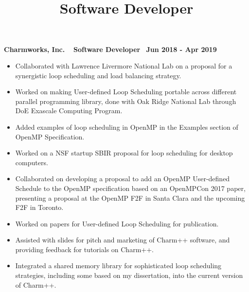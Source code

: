 \title{Software Developer}
\textbf{Charmworks, Inc. $\>$$\>$$\>$$\>$Software Developer$\>$$\>$$\>$$\>$Jun 2018 - Apr 2019}
\vspace{0.0in}
\begin{itemize}
\item Collaborated with Lawrence Livermore National Lab on a proposal for a synergistic loop scheduling and load balancing strategy. 
\item Worked on making User-defined Loop Scheduling portable across different parallel programming library, done with Oak Ridge National Lab through DoE Exascale Computing Program. 
\item Added examples of loop scheduling in OpenMP in the Examples section of OpenMP Specification.
\item Worked on a NSF startup SBIR proposal for loop scheduling for desktop computers. 
\item Collaborated on developing a proposal to add an OpenMP User-defined Schedule to the OpenMP specification based on an OpenMPCon 2017 paper, presenting a proposal at the OpenMP F2F in Santa Clara and the upcoming F2F in Toronto.
\item Worked on papers for User-defined Loop Scheduling for publication.
\item Assisted with slides for pitch and marketing of Charm++ software, and providing feedback for tutorials on Charm++.
\item Integrated a shared memory library for sophisticated loop scheduling strategies, including some based on my dissertation, into the current version of Charm++.
\end{itemize}

